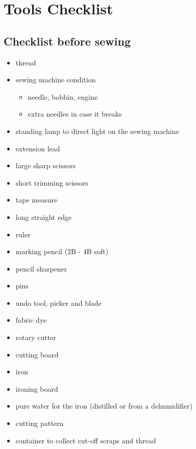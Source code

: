 \chapter{Tools Checklist}

\section{Checklist before sewing}

\begin{itemize}
\tightlist
\item
  thread
\item
  sewing machine condition

  \begin{itemize}
  \tightlist
  \item
    needle, bobbin, engine
  \item
    extra needles in case it breaks
  \end{itemize}
\item
  standing lamp to direct light on the sewing machine
\item
  extension lead
\item
  large sharp scissors
\item
  short trimming scissors
\item
  tape measure
\item
  long straight edge
\item
  ruler
\item
  marking pencil (2B - 4B soft)
\item
  pencil sharpener
\item
  pins
\item
  undo tool, picker and blade
\item
  fabric dye
\item
  rotary cutter
\item
  cutting board
\item
  iron
\item
  ironing board
\item
  pure water for the iron (distilled or from a dehumidifier)
\item
  cutting pattern
\item
  container to collect cut-off scraps and thread
\end{itemize}

